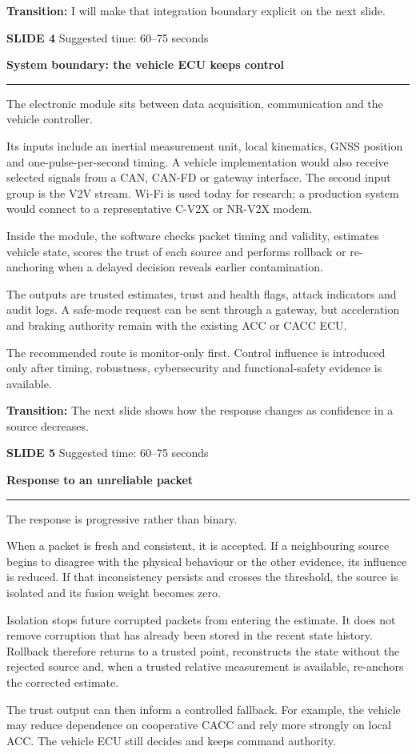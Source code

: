 \documentclass[11pt,a4paper]{article}
\newcommand{\slidetitle}[3]{%
  \clearpage
  {\color{BrandCyan}\large\bfseries SLIDE #1}\hfill
  {\color{Muted}\small Suggested time: #3}\par
  \vspace{0.18cm}
  {\color{BrandBlue}\LARGE\bfseries #2}\par
  \vspace{0.20cm}
  {\color{BrandMagenta}\rule{1.1cm}{1.2pt}}\par
  \vspace{0.12cm}
}
\newcommand{\transition}[1]{%
  \vfill
  \colorbox{Panel}{%
    \parbox{\dimexpr\textwidth-2\fboxsep\relax}{%
      \raggedright\textbf{Transition:} #1}}
}
\begin{document}
\transition{I will make that integration boundary explicit on the next slide.}

\slidetitle{4}{System boundary: the vehicle ECU keeps control}{60--75 seconds}

The electronic module sits between data acquisition, communication and the vehicle controller.

Its inputs include an inertial measurement unit, local kinematics, GNSS position and one-pulse-per-second timing. A vehicle implementation would also receive selected signals from a CAN, CAN-FD or gateway interface. The second input group is the V2V stream. Wi-Fi is used today for research; a production system would connect to a representative C-V2X or NR-V2X modem.

Inside the module, the software checks packet timing and validity, estimates vehicle state, scores the trust of each source and performs rollback or re-anchoring when a delayed decision reveals earlier contamination.

The outputs are trusted estimates, trust and health flags, attack indicators and audit logs. A safe-mode request can be sent through a gateway, but acceleration and braking authority remain with the existing ACC or CACC ECU.

The recommended route is monitor-only first. Control influence is introduced only after timing, robustness, cybersecurity and functional-safety evidence is available.

\transition{The next slide shows how the response changes as confidence in a source decreases.}

\slidetitle{5}{Response to an unreliable packet}{60--75 seconds}

The response is progressive rather than binary.

When a packet is fresh and consistent, it is accepted. If a neighbouring source begins to disagree with the physical behaviour or the other evidence, its influence is reduced. If that inconsistency persists and crosses the threshold, the source is isolated and its fusion weight becomes zero.

Isolation stops future corrupted packets from entering the estimate. It does not remove corruption that has already been stored in the recent state history. Rollback therefore returns to a trusted point, reconstructs the state without the rejected source and, when a trusted relative measurement is available, re-anchors the corrected estimate.

The trust output can then inform a controlled fallback. For example, the vehicle may reduce dependence on cooperative CACC and rely more strongly on local ACC. The vehicle ECU still decides and keeps command authority.
\end{document}
